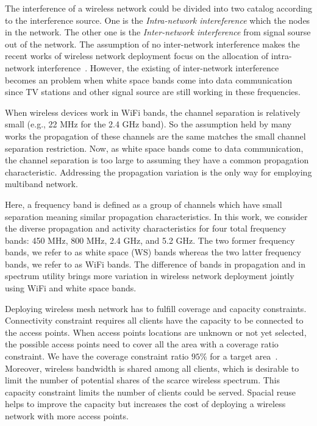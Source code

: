 The interference of a wireless network could be divided into two catalog according
 to the interference source.  One is the {\it Intra-network intereference} which 
 the nodes in the network. The other one is the {\it Inter-network interference}
 from signal sourse out of the network. 
The assumption of no inter-network interference makes the recent works of wireless 
network deployment focus on the allocation of intra-network interference~\cite{si2010overview}. 
However, the existing of inter-network interference becomes an problem when 
white space bands come into data communication since TV stations and other signal source 
are still working in these frequencies.


When wireless devices work in WiFi bands, the channel separation is relatively 
small (e.g., 22 MHz for the 2.4 GHz band). So the assumption held by many works
 the propagation of these channels are the same matches the small channel separation restriction. 
Now, as white space bands come to data communication, the channel separation is 
too large to assuming they have a common propagation characteristic. Addressing 
the propagation variation is the only way for employing multiband network.

Here, a frequency band is defined as a group of channels which have
small separation meaning similar propagation characteristics.
In this work, we consider the diverse propagation and activity characteristics
for four total frequency bands: 450 MHz, 800 MHz, 2.4 GHz, and 5.2 GHz.
The two former frequency bands, we refer to as white space (WS) bands whereas
the two latter frequency bands, we refer to as WiFi bands.
The difference of bands in propagation and in spectrum utility brings 
more variation in wireless network deployment jointly using WiFi and white space bands.

Deploying wireless mesh network has to fulfill coverage and capacity constraints. 
Connectivity constraint requires all clients have the capacity to be connected to the access points.
When access points locations are unknown or not yet selected, the possible access points
 need to cover all the area with a coverage ratio constraint. We have the coverage
constraint ratio $95\%$ for a target area~\cite{robinson2010deploying}. 
Moreover, wireless bandwidth is shared among all clients, which is desirable to 
limit the number of potential shares of the scarce wireless spectrum. 
This capacity constraint limits the number of clients could be served. 
Spacial reuse helps to improve the capacity but increases the cost of deploying a wireless 
network with more access points.  

